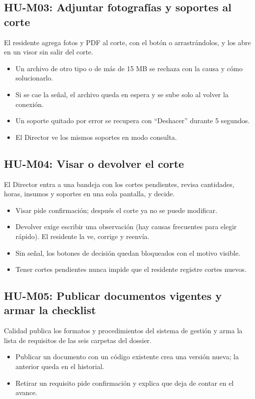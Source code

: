 \documentclass[11pt]{article}
\begin{document}
\subsection*{HU-M03: Adjuntar fotografías y soportes al corte}
El residente agrega fotos y PDF al corte, con el botón o arrastrándolos, y los abre en un visor sin salir del corte.
\begin{itemize}
  \item Un archivo de otro tipo o de más de 15 MB se rechaza con la causa y cómo solucionarlo.
  \item Si se cae la señal, el archivo queda en espera y se sube solo al volver la conexión.
  \item Un soporte quitado por error se recupera con ``Deshacer'' durante 5 segundos.
  \item El Director ve los mismos soportes en modo consulta.
\end{itemize}

\subsection*{HU-M04: Visar o devolver el corte}
El Director entra a una bandeja con los cortes pendientes, revisa cantidades, horas, insumos y soportes en una sola pantalla, y decide.
\begin{itemize}
  \item Visar pide confirmación; después el corte ya no se puede modificar.
  \item Devolver exige escribir una observación (hay causas frecuentes para elegir rápido). El residente la ve, corrige y reenvía.
  \item Sin señal, los botones de decisión quedan bloqueados con el motivo visible.
  \item Tener cortes pendientes nunca impide que el residente registre cortes nuevos.
\end{itemize}

\subsection*{HU-M05: Publicar documentos vigentes y armar la checklist}
Calidad publica los formatos y procedimientos del sistema de gestión y arma la lista de requisitos de las seis carpetas del dossier.
\begin{itemize}
  \item Publicar un documento con un código existente crea una versión nueva; la anterior queda en el historial.
  \item Retirar un requisito pide confirmación y explica que deja de contar en el avance.
\end{itemize}
\end{document}
